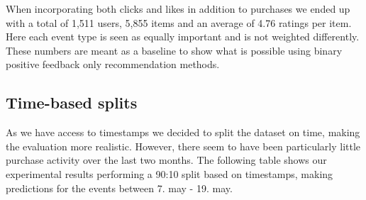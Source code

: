 When incorporating both clicks and likes in addition to purchases we ended up with a total of 1,511 users, 5,855 items
and an average of 4.76 ratings per item. Here each event type is seen as equally important and is not weighted differently.
These numbers are meant as a baseline to show what is possible using binary positive feedback only recommendation methods.

\subsection{Time-based splits}

As we have access to timestamps we decided to split the dataset on time, making the evaluation more realistic. However,
there seem to have been particularly little purchase activity over the last two months. The following table shows our
experimental results performing a 90:10 split based on timestamps, making predictions for the events between 7. may -
19. may.

